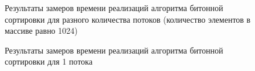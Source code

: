 \begin{figure}[ph!]
	\caption{Результаты замеров времени реализаций алгоритма битонной сортировки для разного количества потоков (количество элементов в массиве равно 1024)}
	\label{fig:timings_fixed_size}
\end{figure}

\begin{figure}[ph!]
	\caption{Результаты замеров времени реализаций алгоритма битонной сортировки для 1 потока}
	\label{fig:timings_1_thread}
\end{figure}

